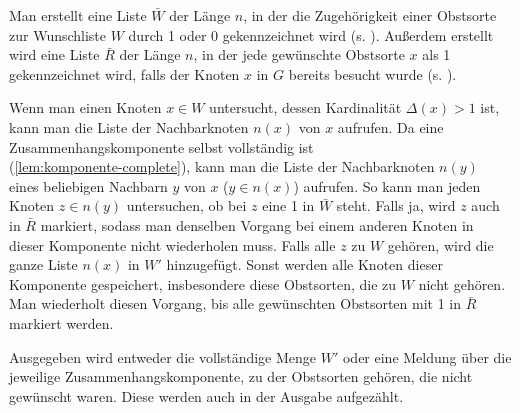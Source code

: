 Man erstellt eine Liste $\bar{W}$ der Länge $n$,
in der die Zugehörigkeit einer Obstsorte zur Wunschliste $W$ durch 1 oder 0 gekennzeichnet wird
(s. ). Außerdem erstellt wird eine Liste $\bar{R}$ der Länge $n$,
in der jede gewünschte Obstsorte $x$ als 1 gekennzeichnet wird, falls der Knoten $x$ in $G$ bereits
besucht wurde (s. ).

Wenn man einen Knoten $x \in W$ untersucht, dessen Kardinalität $\Delta(x) > 1$ ist,
kann man die Liste der Nachbarknoten $n(x)$ von $x$ aufrufen.
Da eine Zusammenhangskomponente selbst vollständig ist\\ (\cref{lem:komponente-complete}),
kann man die Liste der Nachbarknoten $n(y)$ eines beliebigen Nachbarn $y$ von $x$ ($y \in n(x)$) aufrufen.
So kann man jeden Knoten $z \in n(y)$ untersuchen, ob bei $z$ eine 1 in $\bar{W}$ steht.
Falls ja, wird $z$ auch in $\bar{R}$ markiert,
sodass man denselben Vorgang bei einem anderen Knoten in dieser Komponente nicht wiederholen muss.
Falls alle $z$ zu $W$ gehören, wird
die ganze Liste $n(x)$ in $W'$ hinzugefügt. Sonst werden alle Knoten dieser Komponente 
gespeichert, insbesondere diese Obstsorten, die zu $W$ nicht gehören.\\
Man wiederholt diesen Vorgang, bis alle gewünschten Obstsorten mit 1 in $\bar{R}$ markiert werden.

Ausgegeben wird entweder die vollständige Menge $W'$ oder eine Meldung über die jeweilige 
Zusammenhangskomponente, zu der Obstsorten gehören, die nicht gewünscht waren.
Diese werden auch in der Ausgabe aufgezählt.
